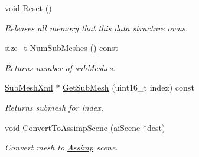 \begin{DoxyCompactItemize}
\item 
\hypertarget{class_assimp_1_1_ogre_1_1_mesh_xml_a3d7a5ac434d5cb53f935ed10e5a45311}{void \hyperlink{class_assimp_1_1_ogre_1_1_mesh_xml_a3d7a5ac434d5cb53f935ed10e5a45311}{Reset} ()}\label{class_assimp_1_1_ogre_1_1_mesh_xml_a3d7a5ac434d5cb53f935ed10e5a45311}

\begin{DoxyCompactList}\small\item\em Releases all memory that this data structure owns. \end{DoxyCompactList}\item 
\hypertarget{class_assimp_1_1_ogre_1_1_mesh_xml_a93a77264b417c5d7e19936d559c1600a}{size\+\_\+t \hyperlink{class_assimp_1_1_ogre_1_1_mesh_xml_a93a77264b417c5d7e19936d559c1600a}{Num\+Sub\+Meshes} () const }\label{class_assimp_1_1_ogre_1_1_mesh_xml_a93a77264b417c5d7e19936d559c1600a}

\begin{DoxyCompactList}\small\item\em Returns number of sub\+Meshes. \end{DoxyCompactList}\item 
\hypertarget{class_assimp_1_1_ogre_1_1_mesh_xml_aa92ed7ca938673d7f43d2dfa81ce5c04}{\hyperlink{class_assimp_1_1_ogre_1_1_sub_mesh_xml}{Sub\+Mesh\+Xml} $\ast$ \hyperlink{class_assimp_1_1_ogre_1_1_mesh_xml_aa92ed7ca938673d7f43d2dfa81ce5c04}{Get\+Sub\+Mesh} (uint16\+\_\+t index) const }\label{class_assimp_1_1_ogre_1_1_mesh_xml_aa92ed7ca938673d7f43d2dfa81ce5c04}

\begin{DoxyCompactList}\small\item\em Returns submesh for {\ttfamily index}. \end{DoxyCompactList}\item 
\hypertarget{class_assimp_1_1_ogre_1_1_mesh_xml_a28af656567c5fa18087d600fe71e7dc8}{void \hyperlink{class_assimp_1_1_ogre_1_1_mesh_xml_a28af656567c5fa18087d600fe71e7dc8}{Convert\+To\+Assimp\+Scene} (\hyperlink{structai_scene}{ai\+Scene} $\ast$dest)}\label{class_assimp_1_1_ogre_1_1_mesh_xml_a28af656567c5fa18087d600fe71e7dc8}

\begin{DoxyCompactList}\small\item\em Convert mesh to \hyperlink{class_assimp}{Assimp} scene. \end{DoxyCompactList}\end{DoxyCompactItemize}
